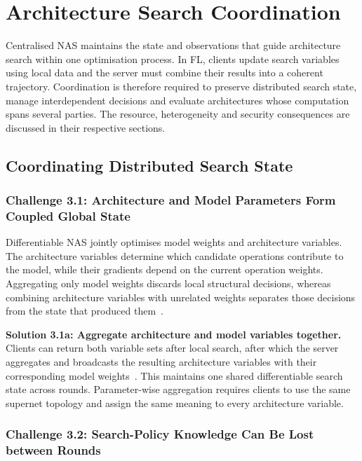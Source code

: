 \section{Architecture Search Coordination}

Centralised NAS maintains the state and observations that guide architecture search within one optimisation process. In FL, clients update search variables using local data and the server must combine their results into a coherent trajectory. Coordination is therefore required to preserve distributed search state, manage interdependent decisions and evaluate architectures whose computation spans several parties. The resource, heterogeneity and security consequences are discussed in their respective sections.

\subsection{Coordinating Distributed Search State}

\subsubsection{Challenge 3.1: Architecture and Model Parameters Form Coupled Global State}

Differentiable NAS jointly optimises model weights and architecture variables. The architecture variables determine which candidate operations contribute to the model, while their gradients depend on the current operation weights. Aggregating only model weights discards local structural decisions, whereas combining architecture variables with unrelated weights separates those decisions from the state that produced them~\cite{fednas_2021,dfnas_2020,feathers_2023}.

\noindent\textbf{Solution 3.1a: Aggregate architecture and model variables together.} Clients can return both variable sets after local search, after which the server aggregates and broadcasts the resulting architecture variables with their corresponding model weights~\cite{fednas_2021,dfnas_2020,feathers_2023}. This maintains one shared differentiable search state across rounds. Parameter-wise aggregation requires clients to use the same supernet topology and assign the same meaning to every architecture variable.

\subsubsection{Challenge 3.2: Search-Policy Knowledge Can Be Lost between Rounds}

